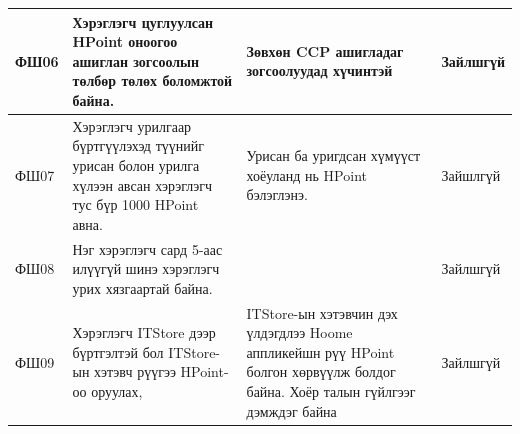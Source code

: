 \begin{table}[h]
  \begin{tabular}{|p{1cm}|p{6cm}|p{6cm}|l|}
    \hline
    ФШ06 & Хэрэглэгч цуглуулсан HPoint оноогоо ашиглан зогсоолын төлбөр төлөх боломжтой байна. & Зөвхөн CCP ашигладаг зогсоолуудад хүчинтэй & Зайлшгүй \\ \hline
    ФШ07 & Хэрэглэгч урилгаар бүртгүүлэхэд түүнийг урисан болон урилга хүлээн авсан хэрэглэгч тус бүр 1000 HPoint авна. & Урисан ба уригдсан хүмүүст хоёуланд нь HPoint бэлэглэнэ. & Зайшлгүй \\ \hline
    ФШ08 & Нэг хэрэглэгч сард 5-аас илүүгүй шинэ хэрэглэгч урих хязгаартай байна. && Зайлшгүй \\ \hline
    ФШ09 & Хэрэглэгч ITStore дээр бүртгэлтэй бол ITStore-ын хэтэвч рүүгээ HPoint-оо оруулах, & ITStore-ын хэтэвчин дэх үлдэгдлээ Hoome аппликейшн рүү HPoint болгон хөрвүүлж болдог байна. Хоёр талын гүйлгээг дэмждэг байна & Зайлшгүй \\ \hline
  \end{tabular}
\end{table}
